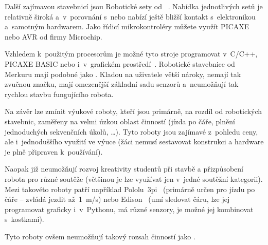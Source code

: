 
Další zajímavou stavebnicí jsou Robotické sety od ~\cite{merkur_roboticsSetsEshop}. 
Nabídka jednotlivých setů je relativně široká a~v~porovnání s~\legoM{ }nebo \fischerT{ }nabízí ještě bližší kontakt s~elektronikou a~samotným hardwarem. 
Jako řídicí mikrokontroléry můžete využít PICAXE nebo AVR od firmy Microchip. 
% 
% 
% 
% 
% 
%
%

Vzhledem k~použitým procesorům je možné tyto stroje programovat v~C/C++, PICAXE BASIC nebo i~v~grafickém prostředí~\cite{picaxeCz_BlocklyForPICAXE}. 
Robotické stavebnice od Merkuru mají podobné  jako \fischerT. 
Kladou na uživatele větší nároky, nemají tak zvučnou značku, mají omezenější základní sadu senzorů a~neumožňují tak rychlou stavbu fungujícího robota.

Na závěr lze zmínit výukové roboty, kteří jsou primárně, na rozdíl od robotických stavebnic, zaměřeny na velmi úzkou oblast činností (jízda po čáře, plnění jednoduchých sekvenčních úkolů, \dots). 
Tyto roboty jsou zajímavé z~pohledu ceny, ale i~jednoduššího využití ve výuce (žáci nemusí sestavovat konstrukci a hardware je plně připraven k~používání). 

Naopak již neumožňují rozvoj kreativity studentů při stavbě a přizpůsobení robota pro různé soutěže (většinou je lze využívat jen v~jedné soutěžní kategorii).  
Mezi takovéto roboty patří například Pololu~3pi~\cite{robotPololu3pi} (primárně určen pro jízdu po čáře -- zvládá jezdit až~1~m/s) nebo Edison~\cite{robotEdison} (umí sledovat čáru, lze jej programovat graficky i~v~Pythonu, má různé senzory, je možné jej kombinovat s~\lego{ }kostkami). 

Tyto roboty ovšem neumožňují takový rozsah činností jako \legoM.

